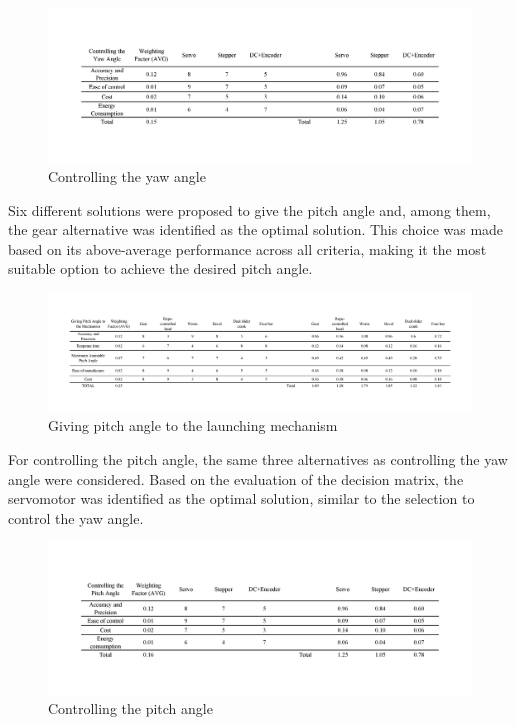 \documentclass[12pt]{report}
\begin{document}
\begin{figure}[H]
    \centering
    \includegraphics[width=1\textwidth]{Decision matrices/controlling yaw.png}
    \caption{Controlling the yaw angle}
\end{figure}

Six different solutions were proposed to give the pitch angle and, among them, the gear alternative was identified as the optimal solution. This choice was made based on its above-average performance across all criteria, making it the most suitable option to achieve the desired pitch angle.

\begin{figure}[H]
    \centering
    \includegraphics[width=1\textwidth]{Decision matrices/pitch.png}
    \caption{Giving pitch angle to the launching mechanism}
\end{figure}

For controlling the pitch angle, the same three alternatives as controlling the yaw angle were considered. Based on the evaluation of the decision matrix, the servomotor was identified as the optimal solution, similar to the selection to control the yaw angle.

\begin{figure}[H]
    \centering
    \includegraphics[width=1\textwidth]{Decision matrices/controlling pitch.png}
    \caption{Controlling the pitch angle}
\end{figure}
\end{document}
